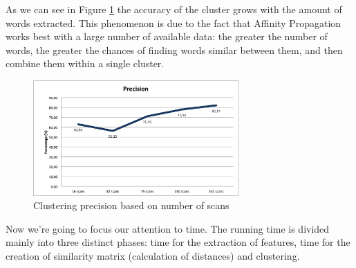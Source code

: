 As we can see in Figure \ref{fig:precision} the accuracy of the cluster grows with the amount of words extracted. This phenomenon is due to the fact that Affinity Propagation works best with a large number of available data: the greater the number of words, the greater the chances of finding words similar between them, and then combine them within a single cluster.

\begin{figure}[!htbp]
\centering
\includegraphics[width=0.7\textwidth]{images/precisione.png}
\caption{Clustering precision based on number of scans}
\label{fig:precision}
\end{figure}

Now we're going to focus our attention to time. The running time is divided mainly into three distinct phases: time for the extraction of features, time for the creation of similarity matrix (calculation of distances) and clustering.

